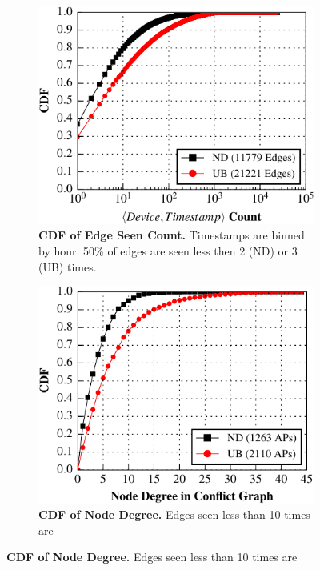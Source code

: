 \begin{figure}[t]
  \centering
  \begin{subfigure}[t]{0.3\textwidth}
    \includegraphics[width=\columnwidth]{./figures/CampusConflictWeight.pdf}
    \caption{\textbf{CDF of Edge Seen Count.} Timestamps are binned by hour. 50\%
    of edges are seen less then 2 (ND) or 3 (UB) times.}
    \label{fig:campus_edge_weight}
  \end{subfigure}%
  \begin{subfigure}[t]{0.3\textwidth}
    \includegraphics[width=\columnwidth]{./figures/CampusConflictDegree.pdf}
    \caption{\textbf{CDF of Node Degree.} Edges seen less than 10 times are
}
\end{subfigure}
\end{figure}
